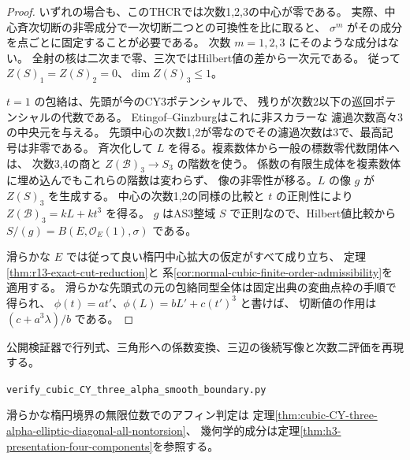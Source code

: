 \begin{proof}
いずれの場合も、このTHCRでは次数1,2,3の中心が零である。
実際、中心斉次切断の非零成分で一次切断二つとの可換性を比に取ると、
$\sigma^m$ がその成分を点ごとに固定することが必要である。
次数 $m=1,2,3$ にそのような成分はない。
全射の核は二次まで零、三次ではHilbert値の差から一次元である。
従って $Z(S)_1=Z(S)_2=0$、$\dim Z(S)_3\le1$。

$t=1$ の包絡は、先頭が今のCY3ポテンシャルで、
残りが次数2以下の巡回ポテンシャルの代数である。
Etingof--Ginzburg\cite[定理3.3.2]{EGdelpezzo}はこれに非スカラーな
濾過次数高々3の中央元を与える。
先頭中心の次数1,2が零なのでその濾過次数は3で、最高記号は非零である。
斉次化して $L$ を得る。複素数体から一般の標数零代数閉体へは、
次数3,4の商と $Z(\mathcal B)_3\to S_3$ の階数を使う。
係数の有限生成体を複素数体に埋め込んでもこれらの階数は変わらず、
像の非零性が移る。$L$ の像 $g$ が $Z(S)_3$ を生成する。
中心の次数1,2の同様の比較と $t$ の正則性により
$Z(\mathcal B)_3=kL+kt^3$ を得る。
$g$ はAS3整域 $S$ で正則なので、Hilbert値比較から
$S/(g)=B(E,\mathcal O_E(1),\sigma)$ である。

滑らかな $E$ では従って良い楕円中心拡大の仮定がすべて成り立ち、
定理\ref{thm:r13-exact-cut-reduction}と
系\ref{cor:normal-cubic-finite-order-admissibility}を適用する。
滑らかな先頭式の元の包絡同型全体は固定出典の変曲点枠の手順で得られ、
$\phi(t)=a t'$、$\phi(L)=bL'+c(t')^3$ と書けば、
切断値の作用は $(c+a^3\lambda)/b$ である。
\end{proof}

公開検証器で行列式、三角形への係数変換、三辺の後続写像と次数二評価を再現する。
\par\noindent\texttt{verify\_cubic\_CY\_three\_alpha\_smooth\_boundary.py}
\par
滑らかな楕円境界の無限位数でのアフィン判定は
定理\ref{thm:cubic-CY-three-alpha-elliptic-diagonal-all-nontorsion}、
幾何学的成分は定理\ref{thm:h3-presentation-four-components}を参照する。

